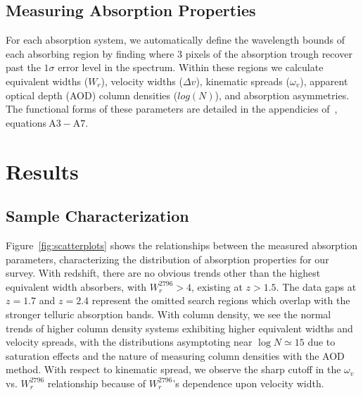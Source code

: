 \documentclass[iop,apj,numberedappendix,appendixfloats,twocolappendix]{emulateapj}
\begin{document}

\subsection{Measuring Absorption Properties}
\label{sec:measuring}

For each absorption system, we automatically define the wavelength bounds of each absorbing region by finding where 3 pixels of the absorption trough recover past the $1\sigma$ error level in the spectrum. Within these regions we calculate equivalent widths ($W_r$), velocity widths ($\Delta v$), kinematic spreads ($\omega_v$), apparent optical depth (AOD) column densities ($log(N)$), and absorption asymmetries. The functional forms of these parameters are detailed in the appendicies of~\cite{Churchill2001}, equations$~\mathrm{A3 - A7}$.



\section{Results}
\label{sec:results}

\subsection{Sample Characterization}
\label{sec:sample}

\begin{figure*}[bth]
\caption{Correlations between measured absorption properties for survey sample. $\log N$ is the AOD column density, $\omega_v$ is the kinematic spread, $W_r^{2796}$ is the rest frame {} equivalent width, and $z$ is the absorption redshift.}
\label{fig:scatterplots}
\end{figure*}

Figure~\ref{fig:scatterplots} shows the relationships between the measured absorption parameters, characterizing the distribution of absorption properties for our survey. With redshift, there are no obvious trends other than the highest equivalent width absorbers, with $W_r^{2796} > 4$, existing at $z > 1.5$. The data gaps at $z = 1.7$ and $z = 2.4$ represent the omitted search regions which overlap with the stronger telluric absorption bands. With column density, we see the normal trends of higher column density systems exhibiting higher equivalent widths and velocity spreads, with the distributions asymptoting near $\log N \simeq 15$ due to saturation effects and the nature of measuring column densities with the AOD method. With respect to kinematic spread, we observe the sharp cutoff in the $\omega_v$ vs. $W_r^{2796}$ relationship because of $W_r^{2796}$'s dependence upon velocity width. 
\end{document}
